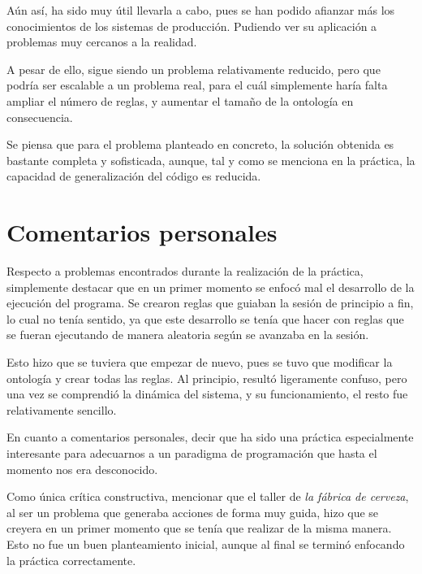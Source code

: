 \documentclass{uc3mpracticas}
\begin{document}
  \vspace{3mm}

  Aún así, ha sido muy útil llevarla a cabo, pues se han podido afianzar más los conocimientos de los sistemas de producción. Pudiendo ver su aplicación a problemas muy cercanos a la realidad.

  \vspace{2mm}

  A pesar de ello, sigue siendo un problema relativamente reducido, pero que podría ser escalable a un problema real, para el cuál simplemente haría falta ampliar el número de reglas, y aumentar el tamaño de la ontología en consecuencia.

  \vspace{2mm}

  Se piensa que para el problema planteado en concreto, la solución obtenida es bastante completa y sofisticada, aunque, tal y como se menciona en la práctica, la capacidad de generalización del código es reducida.


  \section{Comentarios personales}

  Respecto a problemas encontrados durante la realización de la práctica, simplemente destacar que en un primer momento se enfocó mal el desarrollo de la ejecución del programa. Se crearon reglas que guiaban la sesión de principio a fin, lo cual no tenía sentido, ya que este desarrollo se tenía que hacer con reglas que se fueran ejecutando de manera aleatoria según se avanzaba en la sesión.

  \vspace{2mm}

  Esto hizo que se tuviera que empezar de nuevo, pues se tuvo que modificar la ontología y crear todas las reglas. Al principio, resultó ligeramente confuso, pero una vez se comprendió la dinámica del sistema, y su funcionamiento, el resto fue relativamente sencillo.

  \vspace{3mm}

  En cuanto a comentarios personales, decir que ha sido una práctica especialmente interesante para adecuarnos a un paradigma de programación que hasta el momento nos era desconocido.

  \vspace{2mm}

  Como única crítica constructiva, mencionar que el taller de \textit{la fábrica de cerveza}, al ser un problema que generaba acciones de forma muy guida, hizo que se creyera en un primer momento que se tenía que realizar de la misma manera. Esto no fue un buen planteamiento inicial, aunque al final se terminó enfocando la práctica correctamente.
\end{document}
